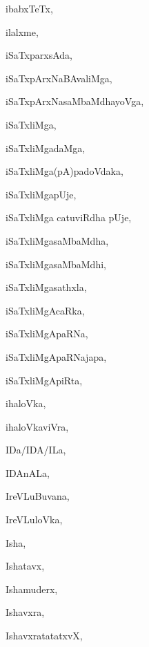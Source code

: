 \begin{multicols}{3}
{\noindent
{ibabxTeTx}, \pageref{ibabxTeTx}

\noindent
{ilalxme}, \pageref{ilalxme}

\noindent
{iSaTxparxsAda}, \pageref{iSaTxparxsAda}

\noindent
{iSaTxpArxNaBAvaliMga}, \pageref{iSaTxpArxNaBAvaliMga}

\noindent
{iSaTxpArxNasaMbaMdhayoVga}, \pageref{iSaTxpArxNasaMbaMdhayoVga}

\noindent
{iSaTxliMga}, \pageref{iSaTxliMga}

\noindent
{iSaTxliMgadaMga}, \pageref{iSaTxliMgadaMga}

\noindent
{iSaTxliMga(pA)padoVdaka}, \pageref{iSaTxliMga(pA)padoVdaka}

\noindent
{iSaTxliMgapUje}, \pageref{iSaTxliMgapUje}

\noindent
{iSaTxliMga catuviRdha pUje}, \pageref{iSaTxliMga catuviRdha pUje}

\noindent
{iSaTxliMgasaMbaMdha}, \pageref{iSaTxliMgasaMbaMdha}

\noindent
{iSaTxliMgasaMbaMdhi}, \pageref{iSaTxliMgasaMbaMdhi}

\noindent
{iSaTxliMgasathxla}, \pageref{iSaTxliMgasathxla}

\noindent
{iSaTxliMgAcaRka}, \pageref{iSaTxliMgAcaRka}

\noindent
{iSaTxliMgApaRNa}, \pageref{iSaTxliMgApaRNa}

\noindent
{iSaTxliMgApaRNajapa}, \pageref{iSaTxliMgApaRNajapa}

\noindent
{iSaTxliMgApiRta}, \pageref{iSaTxliMgApiRta}

\noindent
{ihaloVka}, \pageref{ihaloVka}

\noindent
{ihaloVkaviVra}, \pageref{ihaloVkaviVra}

\noindent
{IDa/IDA/ILa}, \pageref{IDa/IDA/ILa}

\noindent
{IDAnALa}, \pageref{IDAnALa}

\noindent
{IreVLuBuvana}, \pageref{IreVLuBuvana}

\noindent
{IreVLuloVka}, \pageref{IreVLuloVka}

\noindent
{Isha}, \pageref{Isha}

\noindent
{Ishatavx}, \pageref{Ishatavx}

\noindent
{Ishamuderx}, \pageref{Ishamuderx}

\noindent
{Ishavxra}, \pageref{Ishavxra}

\noindent
{IshavxratatatxvX}, \pageref{IshavxratatatxvX}

}
\end{multicols}
